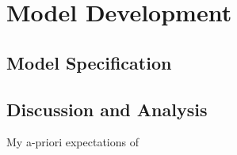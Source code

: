 \section{Model Development}
\subsection{Model Specification}
\subsection{Discussion and Analysis}
My a-priori expectations of